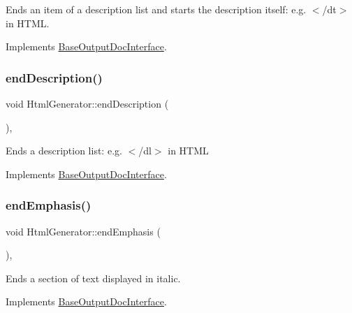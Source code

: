 Ends an item of a description list and starts the description itself\+: e.\+g. {\ttfamily $<$/dt$>$} in H\+T\+ML. 

Implements \mbox{\hyperlink{class_base_output_doc_interface_a09e3aa9d3faac55b2cc9290eaa69f55b}{Base\+Output\+Doc\+Interface}}.

\mbox{\label{class_html_generator_aff598e78fc1ebaefb21fe94fda564e4d}} 
\subsubsection{\texorpdfstring{endDescription()}{endDescription()}}
{\footnotesize\ttfamily void Html\+Generator\+::end\+Description (\begin{DoxyParamCaption}{ }\end{DoxyParamCaption})\hspace{0.3cm}{\ttfamily [inline]}, {\ttfamily [virtual]}}

Ends a description list\+: e.\+g. {\ttfamily $<$/dl$>$} in H\+T\+ML 

Implements \mbox{\hyperlink{class_base_output_doc_interface_ac25c565e9fd8aee6c2b0d9b71fcff380}{Base\+Output\+Doc\+Interface}}.

\mbox{\label{class_html_generator_a88c2f4c34f00161d34e4c1059d747381}} 
\subsubsection{\texorpdfstring{endEmphasis()}{endEmphasis()}}
{\footnotesize\ttfamily void Html\+Generator\+::end\+Emphasis (\begin{DoxyParamCaption}{ }\end{DoxyParamCaption})\hspace{0.3cm}{\ttfamily [inline]}, {\ttfamily [virtual]}}

Ends a section of text displayed in italic. 

Implements \mbox{\hyperlink{class_base_output_doc_interface_aed2cf04d82648509f97403bd4ce62590}{Base\+Output\+Doc\+Interface}}.

\mbox{\label{class_html_generator_aca25e58aa19b44b41de489dc966e4b5d}} 
